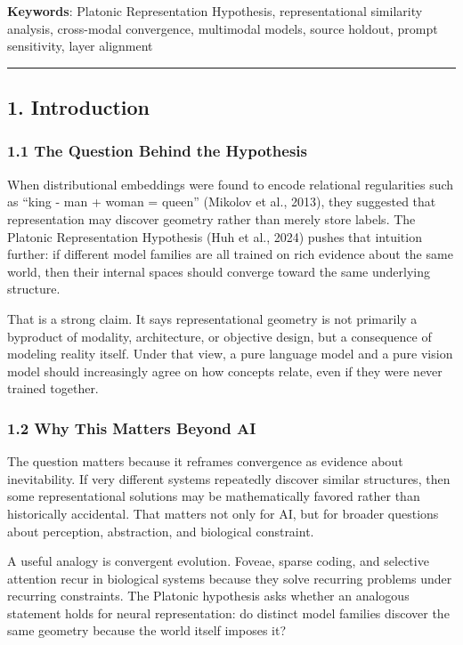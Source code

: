 \documentclass[
]{article}
\begin{document}
\textbf{Keywords}: Platonic Representation Hypothesis, representational
similarity analysis, cross-modal convergence, multimodal models, source
holdout, prompt sensitivity, layer alignment

\begin{center}\rule{0.5\linewidth}{0.5pt}\end{center}

\subsection{1. Introduction}\label{introduction}

\subsubsection{1.1 The Question Behind the
Hypothesis}\label{the-question-behind-the-hypothesis}

When distributional embeddings were found to encode relational
regularities such as ``king - man + woman = queen'' (Mikolov et al.,
2013), they suggested that representation may discover geometry rather
than merely store labels. The Platonic Representation Hypothesis (Huh et
al., 2024) pushes that intuition further: if different model families
are all trained on rich evidence about the same world, then their
internal spaces should converge toward the same underlying structure.

That is a strong claim. It says representational geometry is not
primarily a byproduct of modality, architecture, or objective design,
but a consequence of modeling reality itself. Under that view, a pure
language model and a pure vision model should increasingly agree on how
concepts relate, even if they were never trained together.

\subsubsection{1.2 Why This Matters Beyond
AI}\label{why-this-matters-beyond-ai}

The question matters because it reframes convergence as evidence about
inevitability. If very different systems repeatedly discover similar
structures, then some representational solutions may be mathematically
favored rather than historically accidental. That matters not only for
AI, but for broader questions about perception, abstraction, and
biological constraint.

A useful analogy is convergent evolution. Foveae, sparse coding, and
selective attention recur in biological systems because they solve
recurring problems under recurring constraints. The Platonic hypothesis
asks whether an analogous statement holds for neural representation: do
distinct model families discover the same geometry because the world
itself imposes it?
\end{document}
